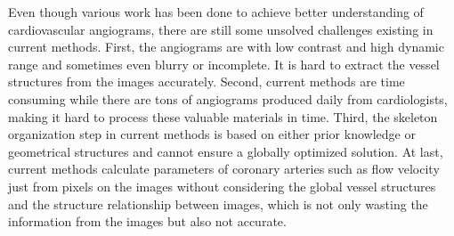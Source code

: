 \documentclass[journal]{IEEEtran}
\begin{document}
Even though various work has been done to achieve better understanding of cardiovascular angiograms, there are still some unsolved challenges existing in current methods. First, the angiograms are with low contrast and high dynamic range and sometimes even blurry or incomplete. It is hard to extract the vessel structures from the images accurately. Second, current methods are time consuming while there are tons of angiograms produced daily from cardiologists, making it hard to process these valuable materials in time. Third, the skeleton organization step in current methods is based on either prior knowledge or geometrical structures and cannot ensure a globally optimized solution. At last, current methods calculate parameters of coronary arteries such as flow velocity just from pixels on the images without considering  the global vessel structures and the structure relationship between images, which is not only wasting the information from the images but also not accurate.
\end{document}
